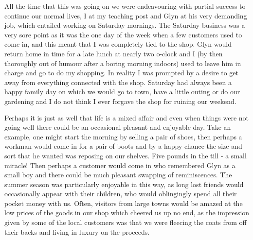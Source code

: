 All the time that this was going on we were endeavouring with partial success to continue our normal lives, I at my teaching post and Glyn at his very demanding job, which entailed working on Saturday mornings. The Saturday business was a very sore point as it was the one day of the week when a few customers used to come in, and this meant that I was completely tied to the shop. Glyn would return home in time for a late lunch at nearly two o-clock and I (by then thoroughly out of humour after a boring morning indoors) used to leave him in charge and go to do my shopping. In reality I was prompted by a desire to get away from everything connected with the shop. Saturday had always been a happy family day on which we would go to town, have a little outing or do our gardening and I do not think I ever forgave the shop for ruining our weekend.

Perhaps it is just as well that life is a mixed affair and even when things were not going well there could be an occasional pleasant and enjoyable day. Take an example, one might start the morning by selling a pair of shoes, then perhaps a workman would come in for a pair of boots and by a happy chance the size and sort that he wanted was reposing on our shelves. Five pounds in the till - a small miracle! Then perhaps a customer would come in who remembered Glyn as a small boy and there could be much pleasant swapping of reminiscences. The summer season was particularly enjoyable in this way, as long lost friends would occasionally appear with their children, who would oblingingly spend all their pocket money with us. Often, visitors from large towns would be amazed at the low prices of the goods in our shop which cheered us up no end, as the impression given by some of the local customers was that we were fleecing the coats from off their backs and living in luxury on the proceeds.

